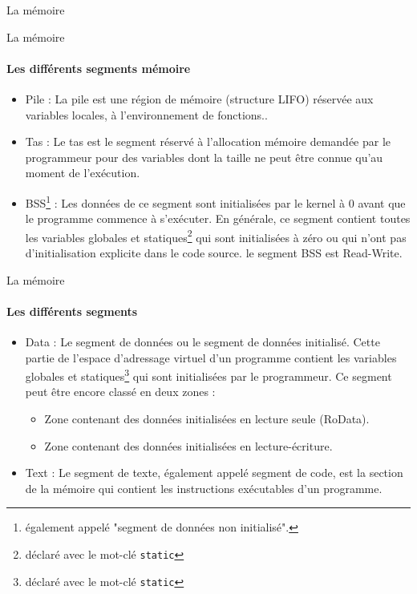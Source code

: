 \documentclass{beamer}
\begin{document}
\begin{darkframes}
\begin{frame}{La mémoire}
\begin{figure}[!h]
  		\end{figure}
  	\end{frame}
  	
  	\begin{frame}{La mémoire}
  		\framesubtitle{Les différents segments mémoire}
  		\begin{itemize}
  			\item \alert{Pile} : La pile est une région de mémoire (structure LIFO) réservée aux variables locales, à l'environnement de fonctions..
  			\item \alert{Tas} : Le tas est le segment réservé à l'allocation mémoire demandée par le programmeur pour des variables dont la taille ne peut être connue qu'au moment de l'exécution.
  			\item \alert{BSS}\footnote[frame]{également appelé "\alert{segment de données non initialisé}".} : Les données de ce segment sont initialisées par le kernel à 0 avant que le programme commence à s'exécuter. En générale, ce segment contient toutes les variables \alert{globales} et \alert{statiques}\footnote[frame]{déclaré avec le mot-clé \texttt{static}} qui sont \alert{initialisées} à zéro ou qui \alert{n'ont pas d'initialisation} explicite dans le code source. le segment BSS est \alert{Read-Write}.
  		\end{itemize}
  	\end{frame}
  
  	\begin{frame}{La mémoire}
  		\framesubtitle{Les différents segments}
  		\begin{itemize}
  			\item \alert{Data} : Le segment de données ou le segment de données initialisé. Cette partie de l'espace d'adressage virtuel d'un programme contient les variables \alert{globales} et \alert{statiques}\footnote[frame]{déclaré avec le mot-clé \texttt{static}} qui sont \alert{initialisées} par le \alert{programmeur}. Ce segment peut être encore classé en deux zones :
  			\begin{itemize}
  				\item Zone contenant des données initialisées en lecture seule (RoData).
  				\item Zone contenant des données initialisées en lecture-écriture.
  			\end{itemize}
  			\item \alert{Text} : Le segment de texte, également appelé segment de code, est la section de la mémoire qui contient les instructions exécutables d'un programme.
  		\end{itemize}
  	\end{frame}


\end{darkframes}
\end{document}
